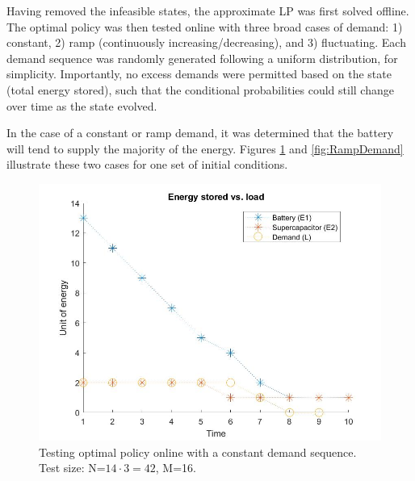 \documentclass[conference]{IEEEtran}
\begin{document}
Having removed the infeasible states, the approximate LP was first solved offline. The optimal policy was then tested online with three broad cases of demand: 1) constant, 2) ramp (continuously increasing/decreasing), and 3) fluctuating. Each demand sequence was randomly generated following a uniform distribution, for simplicity. Importantly, no excess demands were permitted based on the state (total energy stored), such that the conditional probabilities could still change over time as the state evolved.

In the case of a constant or ramp demand, it was determined that the battery will tend to supply the majority of the energy. Figures \ref{fig:ConstDemand} and \ref{fig:RampDemand} illustrate these two cases for one set of initial conditions.
\begin{figure}[htbp]
\centerline{\includegraphics[scale=0.25]{EnergyStoredvsload_ConstantLoad(E1_max=13,E2_max=2).jpg}}
\caption{Testing optimal policy online with a constant demand sequence. Test size: N=$14\cdot3=42$, M=16.}
\label{fig:ConstDemand}
\end{figure}
\end{document}
